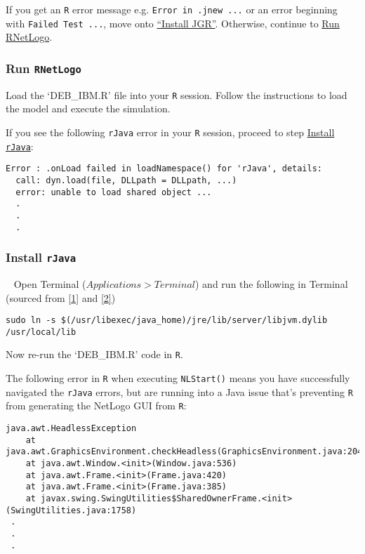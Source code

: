 \documentclass[10,portrait]{article}
\begin{document}
If you get an \texttt{R} error message e.g.
\texttt{Error\ in\ .jnew\ ...} or an error beginning with
\texttt{Failed\ Test\ ...}, move onto
\protect\hyperlink{install-jgr}{``Install JGR''}. Otherwise, continue to
\protect\hyperlink{run-rnetlogo}{Run RNetLogo}.

\hypertarget{run-rnetlogo}{\subsubsection{\texorpdfstring{Run
\texttt{RNetLogo}}{Run RNetLogo}}\label{run-rnetlogo}}

Load the `DEB\_IBM.R' file into your \texttt{R} session. Follow the
instructions to load the model and execute the simulation.

If you see the following \texttt{rJava} error in your \texttt{R}
session, proceed to step \protect\hyperlink{install-rjava}{Install
\texttt{rJava}}:

\begin{verbatim}
Error : .onLoad failed in loadNamespace() for 'rJava', details:
  call: dyn.load(file, DLLpath = DLLpath, ...)
  error: unable to load shared object ...
  .  
  .  
  .  
\end{verbatim}

\hypertarget{install-rjava}{\subsubsection{\texorpdfstring{Install
\texttt{rJava}}{Install rJava}}\label{install-rjava}}

~ Open Terminal (\(Applications > Terminal\)) and run the following in
Terminal (sourced from \protect\hyperlink{references}{{[}1{]}} and
\protect\hyperlink{references}{{[}2{]}}) ~

\begin{verbatim}
sudo ln -s $(/usr/libexec/java_home)/jre/lib/server/libjvm.dylib /usr/local/lib
\end{verbatim}

Now re-run the `DEB\_IBM.R' code in \texttt{R}.

The following error in \texttt{R} when executing \texttt{NLStart()}
means you have successfully navigated the \texttt{rJava} errors, but are
running into a Java issue that's preventing \texttt{R} from generating
the NetLogo GUI from \texttt{R}:

\begin{verbatim}
java.awt.HeadlessException
    at java.awt.GraphicsEnvironment.checkHeadless(GraphicsEnvironment.java:204)
    at java.awt.Window.<init>(Window.java:536)
    at java.awt.Frame.<init>(Frame.java:420)
    at java.awt.Frame.<init>(Frame.java:385)
    at javax.swing.SwingUtilities$SharedOwnerFrame.<init>(SwingUtilities.java:1758)  
 .   
 .  
 .  
\end{verbatim}
\end{document}
